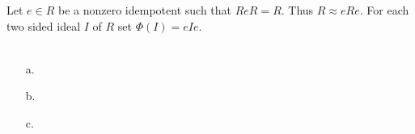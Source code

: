 Let $e\in R$ be a nonzero idempotent such that $ReR=R$. Thus $R\approx eRe$. For each two sided ideal
$I$ of $R$ set $\varPhi(I)=eIe$.\\\\

\begin{enumerate}

    \item[a.] 
    \pagebreak
    \item[b.] 
    \pagebreak
    \item[c.] 
    
\end{enumerate}